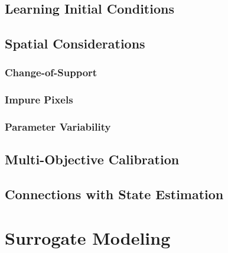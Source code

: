 \documentclass[12pt]{article}
\begin{document}
\subsection{Learning Initial Conditions}

\subsection{Spatial Considerations}
\subsubsection{Change-of-Support}
\subsubsection{Impure Pixels}
\subsubsection{Parameter Variability}

\subsection{Multi-Objective Calibration} \label{multi-objective}

\subsection{Connections with State Estimation}

\section{Surrogate Modeling}
\end{document}

